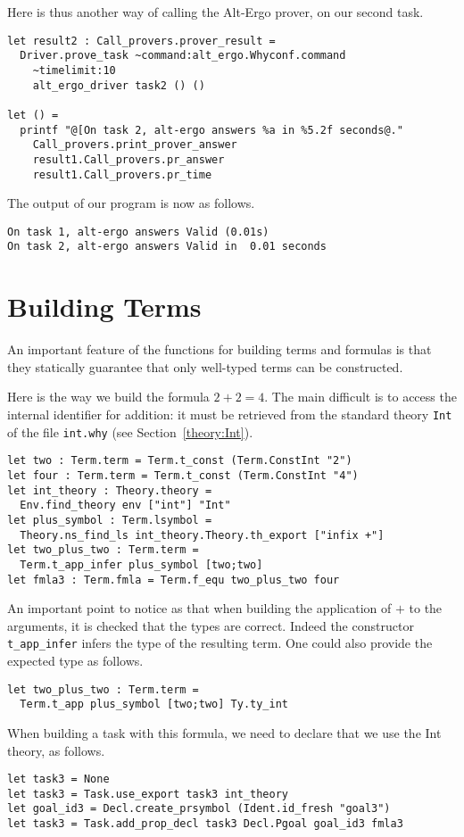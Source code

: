 Here is thus another way of calling the Alt-Ergo prover, on our second task.
\begin{verbatim}
let result2 : Call_provers.prover_result = 
  Driver.prove_task ~command:alt_ergo.Whyconf.command
    ~timelimit:10
    alt_ergo_driver task2 () ()

let () = 
  printf "@[On task 2, alt-ergo answers %a in %5.2f seconds@."
    Call_provers.print_prover_answer 
    result1.Call_provers.pr_answer
    result1.Call_provers.pr_time
\end{verbatim}
The output of our program is now as follows.
\begin{verbatim}
On task 1, alt-ergo answers Valid (0.01s)
On task 2, alt-ergo answers Valid in  0.01 seconds
\end{verbatim}

\section{Building Terms}

An important feature of the functions for building terms and formulas
is that they statically guarantee that only well-typed terms can be
constructed.

Here is the way we build the formula $2+2=4$. The main difficult is to
access the internal identifier for addition: it must be retrieved from
the standard theory \texttt{Int} of the file \texttt{int.why} (see
Section~\ref{theory:Int}).
\begin{verbatim}
let two : Term.term = Term.t_const (Term.ConstInt "2")
let four : Term.term = Term.t_const (Term.ConstInt "4")
let int_theory : Theory.theory = 
  Env.find_theory env ["int"] "Int"
let plus_symbol : Term.lsymbol = 
  Theory.ns_find_ls int_theory.Theory.th_export ["infix +"]
let two_plus_two : Term.term = 
  Term.t_app_infer plus_symbol [two;two] 
let fmla3 : Term.fmla = Term.f_equ two_plus_two four
\end{verbatim}
An important point to notice as that when building the application of
$+$ to the arguments, it is checked that the types are correct. Indeed
the constructor \texttt{t\_app\_infer} infers the type of the resulting
term. One could also provide the expected type as follows.
\begin{verbatim}
let two_plus_two : Term.term = 
  Term.t_app plus_symbol [two;two] Ty.ty_int
\end{verbatim}

When building a task with this formula, we need to declare that we use the Int theory, as follows.
\begin{verbatim}
let task3 = None
let task3 = Task.use_export task3 int_theory
let goal_id3 = Decl.create_prsymbol (Ident.id_fresh "goal3") 
let task3 = Task.add_prop_decl task3 Decl.Pgoal goal_id3 fmla3
\end{verbatim}

